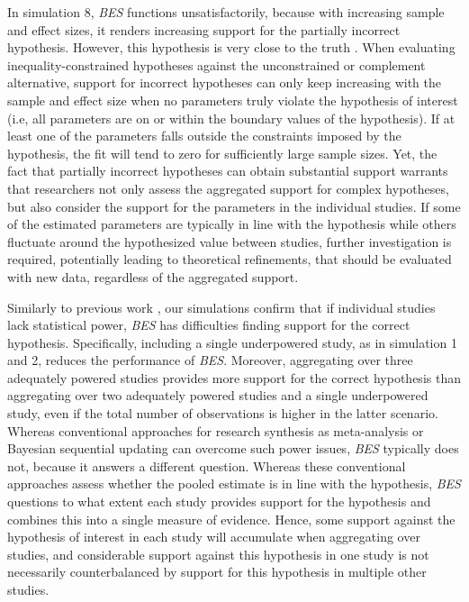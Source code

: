 \documentclass[
]{article}
\begin{document}
In simulation 8, \emph{BES} functions unsatisfactorily, because with
increasing sample and effect sizes, it renders increasing support for
the partially incorrect hypothesis. However, this hypothesis is very
close to the truth \citep[Bayes factors have been proven to prefer the
model that is closest, in terms of Kullback-Leibler divergence, to the
true data-generating model; see][]{ly_bf_2016, berger2013statistical}.
When evaluating inequality-constrained hypotheses against the
unconstrained or complement alternative, support for incorrect
hypotheses can only keep increasing with the sample and effect size when
no parameters truly violate the hypothesis of interest (i.e, all
parameters are on or within the boundary values of the hypothesis). If
at least one of the parameters falls outside the constraints imposed by
the hypothesis, the fit will tend to zero for sufficiently large sample
sizes. Yet, the fact that partially incorrect hypotheses can obtain
substantial support warrants that researchers not only assess the
aggregated support for complex hypotheses, but also consider the support
for the parameters in the individual studies. If some of the estimated
parameters are typically in line with the hypothesis while others
fluctuate around the hypothesized value between studies, further
investigation is required, potentially leading to theoretical
refinements, that should be evaluated with new data, regardless of the
aggregated support.

Similarly to previous work \citep[e.g.,][]{klugkist_volker_2023}, our
simulations confirm that if individual studies lack statistical power,
\emph{BES} has difficulties finding support for the correct hypothesis.
Specifically, including a single underpowered study, as in simulation 1
and 2, reduces the performance of \emph{BES}. Moreover, aggregating over
three adequately powered studies provides more support for the correct
hypothesis than aggregating over two adequately powered studies and a
single underpowered study, even if the total number of observations is
higher in the latter scenario. Whereas conventional approaches for
research synthesis as meta-analysis or Bayesian sequential updating can
overcome such power issues, \emph{BES} typically does not, because it
answers a different question. Whereas these conventional approaches
assess whether the pooled estimate is in line with the hypothesis,
\emph{BES} questions to what extent each study provides support for the
hypothesis and combines this into a single measure of evidence. Hence,
some support against the hypothesis of interest in each study will
accumulate when aggregating over studies, and considerable support
against this hypothesis in one study is not necessarily counterbalanced
by support for this hypothesis in multiple other studies.
\end{document}
